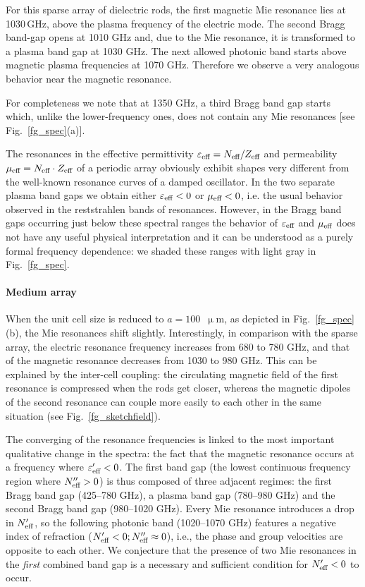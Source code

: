 For this sparse array of dielectric rods, the first magnetic Mie resonance lies at 1030\,GHz, above the plasma frequency of the electric mode.  The second Bragg band-gap opens at 1010 GHz and, due to the Mie resonance, it is transformed to a plasma band gap at 1030 GHz. The next allowed photonic band starts above magnetic plasma frequencies at 1070 GHz. Therefore we observe a very analogous behavior near the magnetic resonance. 

For completeness we note that at 1350 GHz, a third Bragg band gap starts which, unlike the lower-frequency ones, does not contain any Mie resonances [see Fig.\ \ref{fg_spec}(a)].

The resonances in the effective permittivity $\varepsilon_{\text{eff} }=N_{\text{eff} }/Z_{\text{eff} }$ and permeability $\mu_{\text{eff} } = N_{\text{eff} }\cdot Z_{\text{eff} }$ of a periodic array obviously exhibit shapes very different from the well-known resonance curves of a damped oscillator\cite{koschny2003resonant}. In the two separate plasma band gaps we obtain either $\varepsilon_{\text{eff} } < 0$ or $\mu_{\text{eff} }<0$, i.e. the usual behavior observed in the reststrahlen bands of resonances. However, in the Bragg band gaps occurring just below these spectral ranges the behavior of $\varepsilon_{\text{eff} }$ and $\mu_{\text{eff} }$ does not have any useful physical interpretation and it can be understood as a purely formal frequency dependence: we shaded these ranges with light gray in Fig.~\ref{fg_spec}.
\paragraph{Medium array}%
When the unit cell size is reduced to $a=100$~$\upmu$m, as depicted in Fig.~\ref{fg_spec}(b), the Mie resonances shift slightly. Interestingly, in comparison with the sparse array, the electric resonance frequency increases from 680 to 780 GHz, and that of the magnetic resonance decreases from 1030 to 980 GHz. This can be explained by the inter-cell coupling: the circulating magnetic field of the first resonance is compressed when the rods get closer, whereas the magnetic dipoles of the second resonance can couple more easily to each other in the same situation (see Fig.~\ref{fg_sketchfield}).

The converging of the resonance frequencies is linked to the most important qualitative change in the spectra: the fact that the magnetic resonance occurs at a frequency where $\varepsilon_{\text{eff} }'<0$. The first band gap (the lowest continuous frequency region where $N_{\text{eff} }''>0$) is thus composed of three adjacent regimes: the first Bragg band gap (425--780 GHz), a plasma band gap (780--980 GHz) and the second Bragg band gap (980--1020 GHz). Every Mie resonance introduces a drop in $N_{\text{eff} }'$, so the following photonic band (1020--1070 GHz) features a negative index of refraction ($N_{\text{eff} }'<0; N_{\text{eff} }''\approx 0$), i.e., the phase and group velocities are opposite to each other. We conjecture that the presence of two Mie resonances in the \textit{first} combined band gap is a necessary and sufficient condition for $N_{\text{eff} }'<0$ to occur.

